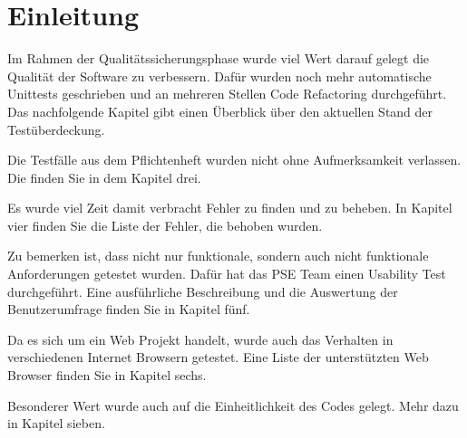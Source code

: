 \chapter{Einleitung}

Im Rahmen der Qualitätssicherungsphase wurde viel Wert darauf gelegt die Qualität der Software zu verbessern. Dafür wurden noch mehr automatische \gls{Unittest}s geschrieben und an mehreren Stellen Code \gls{Refactoring} durchgeführt. Das nachfolgende Kapitel gibt einen Überblick über den aktuellen Stand der Testüberdeckung. \newline

Die Testfälle aus dem Pflichtenheft wurden nicht ohne Aufmerksamkeit verlassen. Die finden Sie in dem Kapitel drei. \newline

Es wurde viel Zeit damit verbracht  Fehler zu finden und zu beheben. In Kapitel vier finden Sie die Liste der Fehler, die behoben wurden. \newline 

Zu bemerken ist, dass nicht nur funktionale, sondern auch nicht funktionale Anforderungen getestet wurden. Dafür hat das PSE Team einen Usability Test durchgeführt. Eine ausführliche Beschreibung und die Auswertung der Benutzerumfrage finden Sie in Kapitel fünf.  \newline

Da es sich um ein Web Projekt handelt, wurde auch das Verhalten in verschiedenen Internet Browsern getestet. Eine Liste der unterstützten Web Browser finden Sie in Kapitel sechs. \newline

Besonderer Wert wurde auch auf die Einheitlichkeit des Codes gelegt. Mehr dazu in Kapitel sieben. \newline